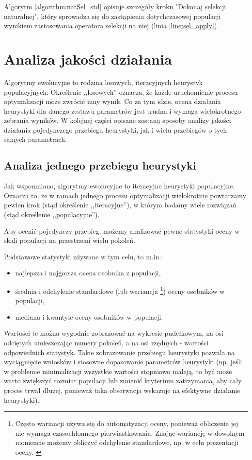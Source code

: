 \documentclass[./FM_mgr.tex]{subfiles}
\begin{document}
Algorytm \ref{algorithm:natSel_std} opisuje szczegóły kroku "Dokonaj selekcji naturalnej", który sprowadza się do zastąpienia dotychczasowej populacji wynikiem zastosowania operatora selekcji na niej (linia \ref{line:sel_apply}).

\section{Analiza jakości działania}

Algorytmy ewolucyjne to rodzina losowych, iteracyjnych heurystyk populacyjnych. Określenie ,,losowych'' oznacza, że każde uruchomienie procesu optymalizacji może zwrócić inny wynik. Co za tym idzie, ocena działania heurystyki dla danego zestawu parametrów jest trudna i wymaga wielokrotnego zebrania wyników. W kolejnej części opisane zostaną sposoby analizy jakości działania pojedynczego przebiegu heurystyki, jak i wielu przebiegów o tych samych parametrach.

\subsection{Analiza jednego przebiegu heurystyki}

Jak wspomniano, algorytmy ewolucyjne to iteracyjne heurystyki populacyjne. Oznacza to, że w ramach jednego procesu optymalizacji wielokrotnie powtarzamy pewien krok (stąd określenie ,,iteracyjne''), w którym badamy wiele rozwiązań (stąd określenie ,,populacyjne'').

Aby ocenić pojedynczy przebieg, możemy analizować pewne statystyki oceny w skali populacji na przestrzeni wielu pokoleń.

Podstawowe statystyki używane w tym celu, to m.in.:
\begin{itemize}
	\item najlepsza i najgorsza ocena osobnika z populacji,
	\item średnia i odchylenie standardowe (lub wariancja \footnote{Często wariancji używa się do automatyzacji oceny, ponieważ obliczenie jej nie wymaga czasochłonnego pierwiastkowania. Znając wariancję w dowolnym momencie możemy obliczyć odchylenie standardowe, np. w celu prezentacji oceny.  \label{footer:variance}}) oceny osobników w populacji,
	\item mediana i kwantyle oceny osobników w populacji.
\end{itemize}

Wartości te można wygodnie zobrazować na wykresie pudełkowym, na osi odciętych umieszczając numery pokoleń, a na osi rzędnych - wartości odpowiednich statystyk. Takie zobrazowanie przebiegu heurystyki pozwala na wyciągnięcie wniosków i stosowne dopasowanie parametrów heurystyki (np. jeśli w problemie minimalizacji wszystkie wartości stopniowo maleją, to być może warto zwiększyć rozmiar populacji lub zmienić kryterium zatrzymania, aby cały proces trwał dłużej, ponieważ taka obserwacja wskazuje na efektywne działanie heurystyki).
\end{document}
